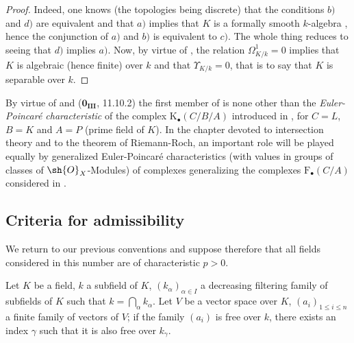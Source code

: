 \begin{proof}
Indeed, one knows (the topologies being discrete) that the conditions $b)$ and $d)$ are equivalent  and that $a)$ implies that $K$ is a formally smooth $k$-algebra , hence the conjunction of $a)$ and $b)$ is equivalent to $c)$.
The whole thing reduces to seeing that $d)$ implies $a)$.
Now, by virtue of , the relation $\Omega^1_{K/k}=0$ implies that $K$ is algebraic (hence finite) over $k$ and that $\Upsilon_{K/k}=0$, that is to say  that $K$ is separable over $k$.
\end{proof}

\begin{remark}[21.7.5]
\label{0.21.7.5}
By virtue of  and ($\mathbf{0_{III}}$, 11.10.2) the first member of  is none other than the \emph{Euler-Poincar\'e characteristic} of the complex $\mathrm{K}_\bullet(C/B/A)$ introduced in , for $C=L$, $B=K$ and $A=P$ (prime field of $K$).
In the chapter devoted to intersection theory and to the theorem of Riemann-Roch, an important role will be played equally by generalized Euler-Poincar\'e characteristics (with values in groups of classes of $\sh{O}_X$-Modules) of complexes generalizing the complexes $\mathrm{F}_\bullet(C/A)$ considered in .
\end{remark}

\subsection{Criteria for admissibility}
\label{subsection:0.21.8}

We return to our previous conventions and suppose therefore that all fields considered in this number are of characteristic $p>0$.

\begin{lemma}[21.8.1]
\label{0.21.8.1}
Let $K$ be a field, $k$ a subfield of $K$, $(k_\alpha)_{\alpha\in I}$ a decreasing filtering family of subfields of $K$ such that $k=\bigcap_\alpha k_\alpha$.
Let $V$ be a vector space over $K$, $(a_i)_{1\leqslant i\leqslant n}$ a finite family of vectors of $V$; if the family $(a_i)$ is free over $k$, there exists an index $\gamma$ such that it is also free over $k_\gamma$.
\end{lemma}

